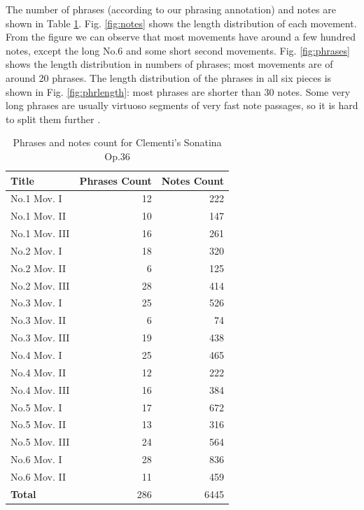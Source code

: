 The number of phrases (according to our phrasing annotation) and notes are shown in Table \ref{tab:clemcount}. Fig. \ref{fig:notes} shows the length distribution of each movement. From the figure we can observe that most movements have around a few hundred notes, except the long No.6 and some short second movements. Fig. \ref{fig:phrases} shows the length distribution in numbers of phrases; most movements are of around 20 phrases. The length distribution of the phrases in all six pieces is shown in Fig. \ref{fig:phrlength}: most phrases are shorter than 30 notes. Some very long phrases are usually virtuoso segments of very fast note passages, so it is hard to split them further .

\begin{table}[bp]
   \centering
   \caption{Phrases and notes count for Clementi's Sonatina Op.36}
   \label{tab:clemcount}
   \begin{tabular}{l|rr}
      \hline
      \textbf{Title}&\textbf{Phrases Count}&\textbf{Notes Count}\\
      \hline
      No.1 Mov. I&12&222\\
      No.1 Mov. II&10&147\\
      No.1 Mov. III&16&261\\
      No.2 Mov. I&18&320\\
      No.2 Mov. II&6&125\\
      No.2 Mov. III&28&414\\
      No.3 Mov. I&25&526\\
      No.3 Mov. II&6&74\\
      No.3 Mov. III&19&438\\
      No.4 Mov. I&25&465\\
      No.4 Mov. II&12&222\\
      No.4 Mov. III&16&384\\
      No.5 Mov. I&17&672\\
      No.5 Mov. II&13&316\\
      No.5 Mov. III&24&564\\
      No.6 Mov. I&28&836\\
      No.6 Mov. II&11&459\\
      \hline
      \textbf{Total} &286&6445\\
      \hline
   \end{tabular}
\end{table}



